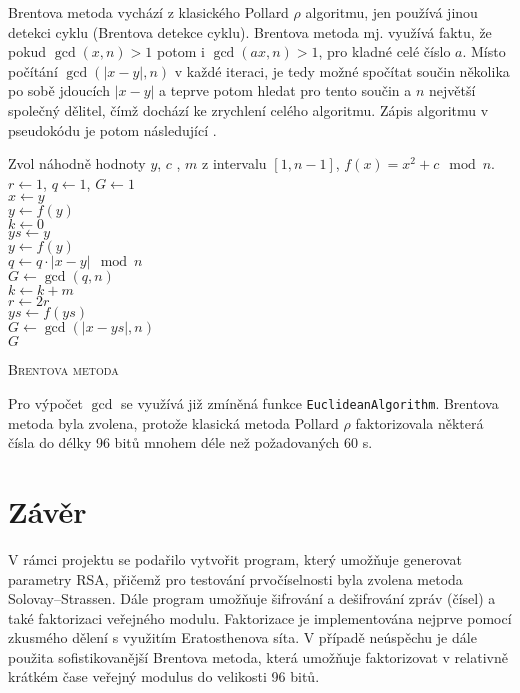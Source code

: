 \documentclass[a4paper,12pt]{article}
\begin{document}
Brentova metoda vychází z klasického Pollard $\rho$ algoritmu, jen používá jinou detekci cyklu (Brentova detekce cyklu). 
Brentova metoda mj. využívá faktu, že pokud $\gcd(x,n) > 1$ potom i $\gcd(ax,n)  > 1$, pro kladné celé číslo $a$.
Místo počítání $\gcd(|x - y|, n)$ v každé iteraci, je tedy možné spočítat součin několika po sobě jdoucích
$|x-y|$ a teprve potom hledat pro tento součin a $n$ největší společný dělitel, čímž dochází ke zrychlení celého
algoritmu. Zápis algoritmu v pseudokódu je potom následující \cite{brent1, ref1}.

\medskip
\begin{algorithm}[H]
 \SetNlSty{}{}{:}
 \SetNlSkip{-1.2em}
 \SetInd{1em}{1em}
 \BlankLine
 \Indentp{1.7em}
    Zvol náhodně hodnoty $y$, $c$ , $m$ z intervalu $[1, n-1]$, $f(x) = x^2 + c\mod n$. \\
    $r\gets 1$, $q\gets 1$, $G\gets 1$ \\
     {
      $x\gets y$ \\
       {
	$y \gets f(y)$ \\
      }
      $k\gets 0$ \\
       {
	$ys \gets y$ \\
	 {
	  $y \gets f(y)$ \\
	  $q \gets q\cdot|x-y|\mod n $ \\
	}
	$G \gets \gcd(q,n)$ \\
	$k \gets k + m$ \\
      }
      $r \gets 2r$ \\
    }
     {
       {
	$ys \gets f(ys)$ \\
	$G \gets \gcd(|x-ys|,n)$ \\
      }
    }
    \Return $G$
 \caption{\textsc{Brentova metoda}}
 \label{fastSlam}
\end{algorithm}

\medskip
Pro výpočet $\gcd$ se využívá již zmíněná funkce \texttt{EuclideanAlgorithm}. Brentova metoda byla zvolena, protože klasická metoda Pollard $\rho$ faktorizovala některá čísla do délky 96 bitů
mnohem déle než požadovaných 60 s.

\section{Závěr}
V rámci projektu se podařilo vytvořit program, který umožňuje generovat parametry RSA, přičemž pro
testování prvočíselnosti byla zvolena metoda Solovay--Strassen. Dále program umožňuje šifrování
a dešifrování zpráv (čísel) a také faktorizaci veřejného modulu. Faktorizace je implementována
nejprve pomocí zkusmého dělení s využitím Eratosthenova síta. V případě neúspěchu je dále použita
sofistikovanější Brentova metoda, která umožňuje faktorizovat v relativně krátkém čase veřejný 
modulus do velikosti 96 bitů. 


{}
\end{document}

